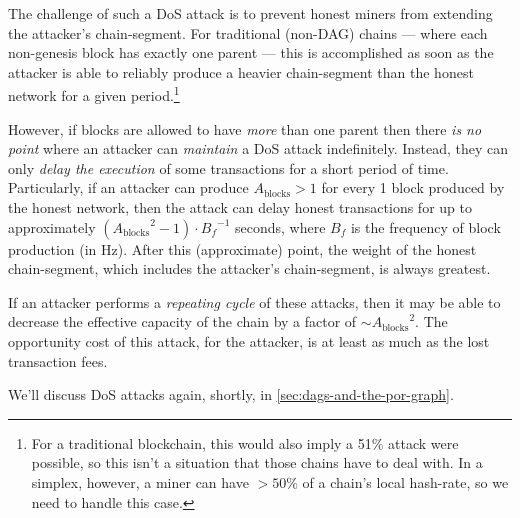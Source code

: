 The challenge of such a DoS attack is to prevent honest miners from extending the attacker's chain-segment.
For traditional (non-DAG) chains --- where each non-genesis block has exactly one parent --- this is accomplished as soon as the attacker is able to reliably produce a heavier chain-segment than the honest network for a given period.\footnote{
    For a traditional blockchain, this would also imply a 51\% attack were possible, so this isn't a situation that those chains have to deal with.
    In a simplex, however, a miner can have $>50\%$ of a chain's local hash-rate, so we need to handle this case.
}

However, if blocks are allowed to have \emph{more} than one parent then there \emph{is no point} where an attacker can \emph{maintain} a DoS attack indefinitely.
Instead, they can only \emph{delay the execution} of some transactions for a short period of time.
Particularly, if an attacker can produce $A_{\text{blocks}} > 1$ for every 1 block produced by the honest network, then the attack can delay honest transactions for up to approximately $({A_{\text{blocks}}}^2 - 1) \cdot {B_f}^{-1}$ seconds, where $B_f$ is the frequency of block production (in Hz).
After this (approximate) point, the weight of the honest chain-segment, which includes the attacker's chain-segment, is always greatest.

If an attacker performs a \emph{repeating cycle} of these attacks, then it may be able to decrease the effective capacity of the chain by a factor of $\sim {A_{\text{blocks}}}^2$. %
The opportunity cost of this attack, for the attacker, is at least as much as the lost transaction fees.

We'll discuss DoS attacks again, shortly, in \autoref{sec:dags-and-the-por-graph}.
